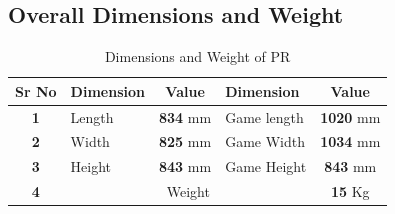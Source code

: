     \subsection{Overall Dimensions and Weight}
        \begin{table}[h]

            \begin{minipage}[t][3.2cm]{\textwidth}
                \begin{minipage}[t]{0.4\textwidth}
                    \centering
                    \caption{Dimensions and Weight of PR} \label{Dimensions_PR} \small
                    \begin{tabular}{|c|l|c|l|c|}
                        \hline  \hline
                        \textbf{Sr No}  & \textbf{Dimension} & \textbf{Value}  & \textbf{Dimension}      & \textbf{Value}   \\ \hline   \hline
                        \textbf{1}      & Length             & \textbf{834} mm & Game length             & \textbf{1020} mm \\ \hline
                        \textbf{2}      & Width              & \textbf{825} mm & Game Width              & \textbf{1034} mm \\ \hline
                        \textbf{3}      & Height             & \textbf{843} mm & Game Height             & \textbf{843} mm  \\ \hline
                        \textbf{4}      & \multicolumn{3}{c|}{Weight}                                    & \textbf{15} Kg   \\ \hline   \hline
                    \end{tabular}
                \end{minipage}                   

\end{minipage}
\end{table}
